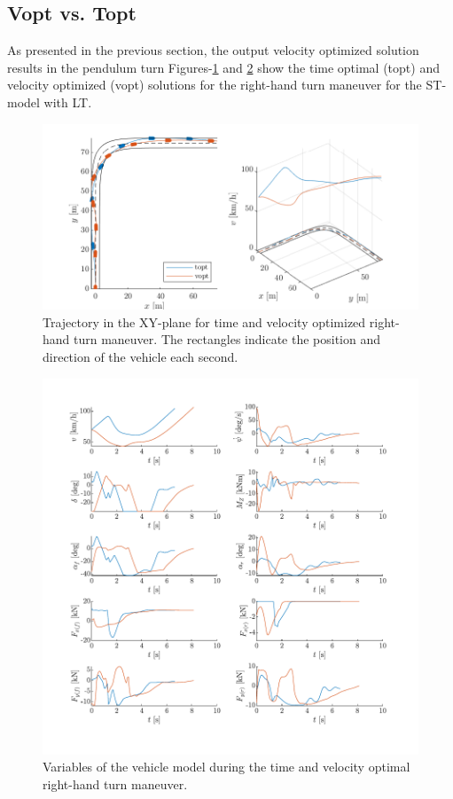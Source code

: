 \subsection{Vopt vs. Topt}
As presented in the previous section, the output velocity optimized solution results in the pendulum turn Figures-\ref{fig:pep2_TVcomp_posplot} and \ref{fig:pep2_TVcomp_detailedplot} show the time optimal (topt) and velocity optimized (vopt) solutions for the right-hand turn maneuver for the ST-model with LT. 

\begin{figure}[h!]
    \centering
    \includegraphics{figures/pep2_TVcomp_posplot.pdf}
    \caption{Trajectory in the XY-plane for time and velocity optimized right-hand turn maneuver. The rectangles indicate the position and direction of the vehicle each second.}
    \label{fig:pep2_TVcomp_posplot}
\end{figure}

\begin{figure}[h!]
    \centering
    \includegraphics{figures/pep2_TVcomp_detailplot.pdf}
    \caption{Variables of the vehicle model during the time and velocity optimal right-hand turn maneuver.}
    \label{fig:pep2_TVcomp_detailedplot}
\end{figure}

